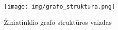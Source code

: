 \begin{figure}[hb]
\centering
\texttt{[image: img/grafo\_struktūra.png]}
\caption{Žiniatinklio grafo struktūros vaizdas}
\label{fig:graph_structure}
\end{figure}